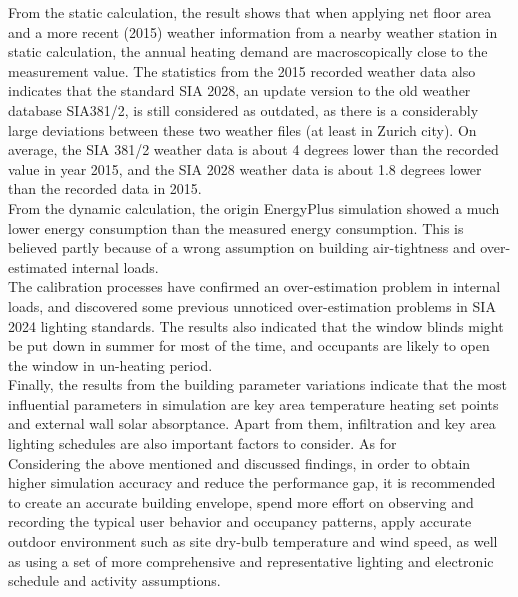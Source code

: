 \documentclass[a4paper, oneside]{discothesis}
\begin{document}
    From the static calculation, the result shows that when applying net floor area and a more recent (2015) weather information from a nearby weather station in static calculation, the annual heating demand are macroscopically close to the measurement value. The statistics from the 2015 recorded weather data also indicates that the standard SIA 2028, an update version to the old weather database SIA381/2, is still considered as outdated, as there is a considerably large deviations between these two weather files (at least in Zurich city). On average, the SIA 381/2 weather data is about 4 degrees lower than the recorded value in year 2015, and the SIA 2028 weather data is about 1.8 degrees lower than the recorded data in 2015.\\

    From the dynamic calculation, the origin EnergyPlus simulation showed a much lower energy consumption than the measured energy consumption. This is believed partly because of a wrong assumption on building air-tightness and over-estimated internal loads.\\

    The calibration processes have confirmed an over-estimation problem in internal loads, and discovered some previous unnoticed over-estimation problems in SIA 2024 lighting standards. The results also indicated that the window blinds might be put down in summer for most of the time, and occupants are likely to open the window in un-heating period.\\

    Finally, the results from the building parameter variations indicate that the most influential parameters in simulation are key area temperature heating set points and external wall solar absorptance. Apart from them, infiltration and key area lighting schedules are also important factors to consider. As for \\

    Considering the above mentioned and discussed findings, in order to obtain higher simulation accuracy and reduce the performance gap, it is recommended to create an accurate building envelope, spend more effort on observing and recording the typical user behavior and occupancy patterns, apply accurate outdoor environment such as site dry-bulb temperature and wind speed, as well as using a set of more comprehensive and representative lighting and electronic schedule and activity assumptions.
\end{document}
